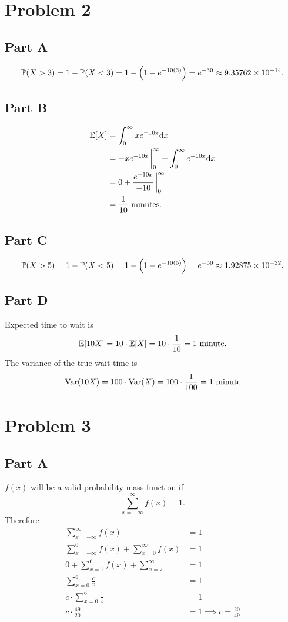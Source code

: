 \documentclass[12pt]{extarticle}
\begin{document}
\section*{Problem 2}
\subsection*{Part A}
\[
	\mathbb{P}\qty(X > 3) = 1 - \mathbb{P}\qty(X < 3) = 1 - \qty(1 - e^{-10(3)}) = e^{-30} \approx 9.35762 \times 10^{-14}
.\]

\subsection*{Part B}
\begin{align*}
	\Exp{X} &= \int_0^\infty x e^{-10x} \dd x \\
					&= -x e^{-10 x} \eval_{0}^{\infty} + \int_0^\infty e^{-10x} \dd x \\
					&= 0 + \frac{e^{-10x}}{-10} \eval_0^\infty \\
					&= \frac{1}{10} \text{ minutes}
.\end{align*}

\subsection*{Part C}
\begin{align*}
	\mathbb{P}\qty(X > 5) = 1 - \mathbb{P}\qty(X < 5) = 1 - \qty(1 - e^{-10(5)}) = e^{-50} \approx 1.92875 \times 10^{-22}
.\end{align*}

\subsection*{Part D}
Expected time to wait is
\begin{align*}
	\mathbb{E}\qty[10 X] = 10\cdot\mathbb{E}\qty[X] = 10 \cdot \frac{1}{10} = 1 \text{ minute}
.\end{align*}
The variance of the true wait time is
\begin{align*}
	\text{Var}\qty(10X) = 100 \cdot\text{Var}\qty(X) = 100\cdot\frac{1}{100} = 1 \text{ minute}
\end{align*}

\section*{Problem 3}
\subsection*{Part A}
$f(x)$ will be a valid probability mass function if
\[
	\sum_{x = -\infty}^{\infty} f(x) = 1
.\]
Therefore
\begin{align*}
	\sum_{x = -\infty}^{\infty} f(x) &= 1 \\
	\sum_{x = -\infty}^{0} f(x) + \sum_{x = 0}^\infty f(x) &= 1 \\
	0 + \sum_{x = 1}^6 f(x) + \sum_{x=7}^\infty &= 1 \\
	\sum_{x = 0}^6 \frac{c}{x} &= 1 \\
	c \cdot\sum_{x = 0}^6 \frac{1}{x} &= 1 \\
	c \cdot\frac{49}{20} &= 1 \implies \boxed{c = \frac{20}{49}}
\end{align*}
\end{document}
